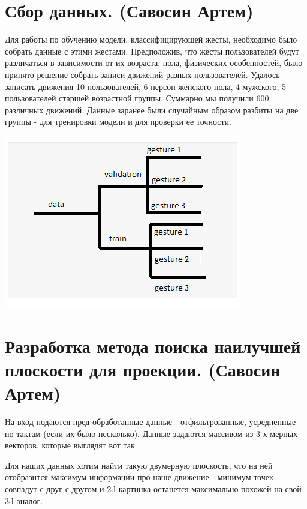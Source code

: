 \section{Сбор данных. (Савосин Артем)}
Для работы по обучению модели, классифицирующей жесты, необходимо было собрать данные с этими жестами. Предположив, что жесты пользователей будут различаться в зависимости от их возраста, пола, физических особенностей, было принято решение собрать записи движений разных пользователей. Удалось записать движения 10 пользователей, 6 персон женского пола, 4 мужского, 5 пользователей старшей возрастной группы.
Суммарно мы получили 600 различных движений.
Данные заранее были случайным образом разбиты на две группы - для тренировки модели и для проверки ее точности.

\includegraphics[scale = 1]{images_sav/data.png}

\section{Разработка метода поиска наилучшей плоскости для проекции. (Савосин Артем)}

На вход подаются пред обработанные данные - отфильтрованные, усредненные по тактам (если их было несколько). Данные задаются массивом из 3-х мерных векторов, которые выглядят вот так
\begin{figure}[H]
\end{figure}
Для наших данных хотим найти такую двумерную плоскость, что на ней отобразится максимум информации про наше движение - минимум точек совпадут с друг с другом и 2d картинка останется максимально похожей на свой 3d аналог. 


